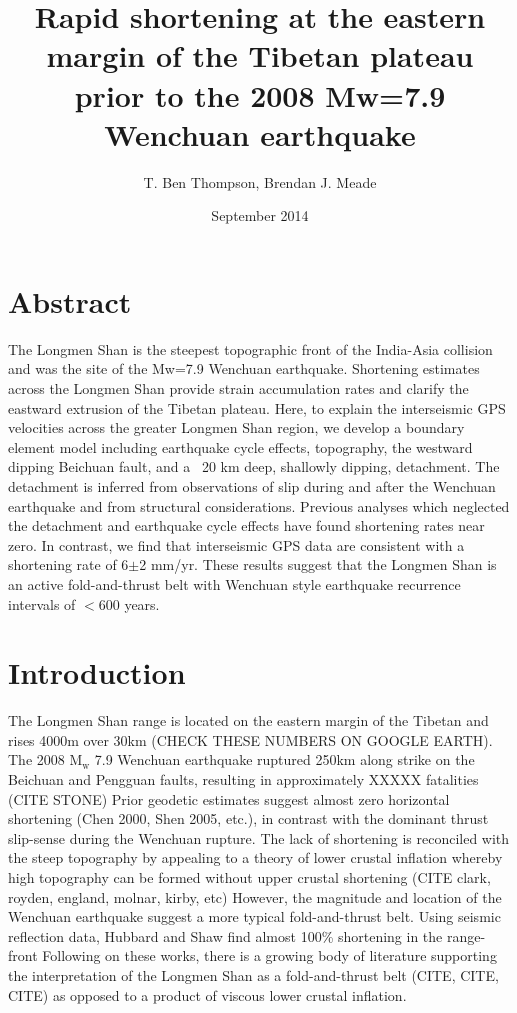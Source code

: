 \documentclass{article}
\title{Rapid shortening at the eastern margin of the Tibetan plateau prior to the 2008 Mw=7.9 Wenchuan earthquake}
\author{T. Ben Thompson, Brendan J. Meade}
\date{September 2014}
\begin{document}
\maketitle

\section{Abstract}
The Longmen Shan is the steepest topographic front of the India-Asia collision and was the site of the Mw=7.9 Wenchuan earthquake.
Shortening estimates across the Longmen Shan provide strain accumulation rates and clarify the eastward extrusion of the Tibetan plateau.
Here, to explain the interseismic GPS velocities across the greater Longmen Shan region, we develop a boundary element model including earthquake cycle effects, topography, the westward dipping Beichuan fault, and a ~20 km deep, shallowly dipping, detachment.
The detachment is inferred from observations of slip during and after the Wenchuan earthquake and from structural considerations.
Previous analyses which neglected the detachment and earthquake cycle effects have found shortening rates near zero.
In contrast, we find that interseismic GPS data are consistent with a shortening rate of 6$\pm$2 mm/yr.
These results suggest that the Longmen Shan is an active fold-and-thrust belt with Wenchuan style earthquake recurrence intervals of $<$600 years.

\section{Introduction}
The Longmen Shan range is located on the eastern margin of the Tibetan and rises 4000m over 30km (CHECK THESE NUMBERS ON GOOGLE EARTH).
The 2008 $\mathrm{M_w}$ 7.9 Wenchuan earthquake ruptured 250km along strike on the Beichuan and Pengguan faults, resulting in approximately XXXXX fatalities (CITE STONE)
Prior geodetic estimates suggest almost zero horizontal shortening (Chen 2000, Shen 2005, etc.), in contrast with the dominant thrust slip-sense during the Wenchuan rupture. 
The lack of shortening is reconciled with the steep topography by appealing to a theory of lower crustal inflation whereby high topography can be formed without upper crustal shortening (CITE clark, royden, england, molnar, kirby, etc)
However, the magnitude and location of the Wenchuan earthquake suggest a more typical fold-and-thrust belt.
Using seismic reflection data, Hubbard and Shaw find almost 100\% shortening in the range-front 
Following on these works, there is a growing body of literature supporting the interpretation of the Longmen Shan as a fold-and-thrust belt (CITE, CITE, CITE) as opposed to a product of viscous lower crustal inflation.
\end{document}
